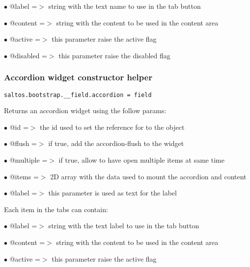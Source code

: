\documentclass[a4paper]{article}
\begin{document}
\begin{compactitem}
\item[\color{myblue}$\bullet$] @label    =$>$ string with the text name to use in the tab button
\item[\color{myblue}$\bullet$] @content  =$>$ string with the content to be used in the content area
\item[\color{myblue}$\bullet$] @active   =$>$ this parameter raise the active flag
\item[\color{myblue}$\bullet$] @disabled =$>$ this parameter raise the disabled flag
\end{compactitem}

\hypertarget{toc648}{}
\subsubsection{Accordion widget constructor helper}

\begin{lstlisting}
saltos.bootstrap.__field.accordion = field
\end{lstlisting}

Returns an accordion widget using the follow params:

\begin{compactitem}
\item[\color{myblue}$\bullet$] @id       =$>$ the id used to set the reference for to the object
\item[\color{myblue}$\bullet$] @flush    =$>$ if true, add the accordion-flush to the widget
\item[\color{myblue}$\bullet$] @multiple =$>$ if true, allow to have open multiple items at same time
\item[\color{myblue}$\bullet$] @items    =$>$ 2D array with the data used to mount the accordion and content
\item[\color{myblue}$\bullet$] @label    =$>$ this parameter is used as text for the label
\end{compactitem}

Each item in the tabs can contain:

\begin{compactitem}
\item[\color{myblue}$\bullet$] @label    =$>$ string with the text label to use in the tab button
\item[\color{myblue}$\bullet$] @content  =$>$ string with the content to be used in the content area
\item[\color{myblue}$\bullet$] @active   =$>$ this parameter raise the active flag
\end{compactitem}
\end{document}
